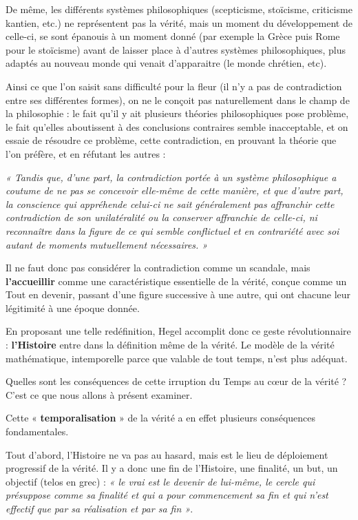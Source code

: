 De même, les différents systèmes philosophiques (scepticisme, stoïcisme, criticisme kantien, etc.) ne représentent pas la vérité, mais un moment du développement de celle-ci, se sont épanouis à un moment donné (par exemple la Grèce puis Rome pour le stoïcisme) avant de laisser place à d’autres systèmes philosophiques, plus adaptés au nouveau monde qui venait d’apparaitre (le monde chrétien, etc).

Ainsi ce que l’on saisit sans difficulté pour la fleur (il n’y a pas de contradiction entre ses différentes formes), on ne le conçoit pas naturellement dans le champ de la philosophie : le fait qu’il y ait plusieurs théories philosophiques pose problème, le fait qu’elles aboutissent à des conclusions contraires semble inacceptable, et on essaie de résoudre ce problème, cette contradiction, en prouvant la théorie que l’on préfère, et en réfutant les autres :

{\it « Tandis que, d’une part, la contradiction portée à un système philosophique a coutume de ne pas se concevoir elle-même de cette manière, et que d’autre part, la conscience qui appréhende celui-ci ne sait généralement pas affranchir cette contradiction de son unilatéralité ou la conserver affranchie de celle-ci, ni reconnaître dans la figure de ce qui semble conflictuel et en contrariété avec soi autant de moments mutuellement nécessaires. »}

Il ne faut donc pas considérer la contradiction comme un scandale, mais {\bf l’accueillir} comme une caractéristique essentielle de la vérité, conçue comme un Tout en devenir, passant d’une figure successive à une autre, qui ont chacune leur légitimité à une époque donnée.

En proposant une telle redéfinition, Hegel accomplit donc ce geste révolutionnaire : {\bf l’Histoire} entre dans la définition même de la vérité. Le modèle de la vérité mathématique, intemporelle parce que valable de tout temps, n’est plus adéquat.

Quelles sont les conséquences de cette irruption du Temps au cœur de la vérité ? C’est ce que nous allons à présent examiner.

Cette « {\bf temporalisation} » de la vérité a en effet plusieurs conséquences fondamentales.

Tout d’abord, l’Histoire ne va pas au hasard, mais est le lieu de déploiement progressif de la vérité. Il y a donc une fin de l’Histoire, une finalité, un but, un objectif (telos en grec) : {\it « le vrai est le devenir de lui-même, le cercle qui présuppose comme sa finalité et qui a pour commencement sa fin et qui n’est effectif que par sa réalisation et par sa fin »}.

